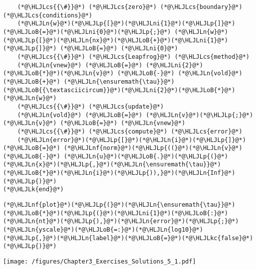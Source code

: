 \documentclass[12pt,a4paper]{article}
\newcommand{\HLJLk}[1]{\textcolor[RGB]{148,91,176}{\textbf{#1}}}
\newcommand{\HLJLkc}[1]{\textcolor[RGB]{59,151,46}{\textit{#1}}}
\newcommand{\HLJLn}[1]{#1}
\newcommand{\HLJLnf}[1]{\textcolor[RGB]{66,102,213}{#1}}
\newcommand{\HLJLni}[1]{\textcolor[RGB]{59,151,46}{#1}}
\newcommand{\HLJLoB}[1]{\textcolor[RGB]{102,102,102}{\textbf{#1}}}
\newcommand{\HLJLp}[1]{#1}
\newcommand{\HLJLcs}[1]{\textcolor[RGB]{153,153,119}{\textit{#1}}}
\begin{document}
\begin{lstlisting}
    (*@\HLJLcs{{\#}}@*) (*@\HLJLcs{zero}@*) (*@\HLJLcs{boundary}@*) (*@\HLJLcs{conditions}@*)
    (*@\HLJLn{w}@*)(*@\HLJLp{[}@*)(*@\HLJLni{1}@*)(*@\HLJLp{]}@*)(*@\HLJLoB{=}@*)(*@\HLJLni{0}@*)(*@\HLJLp{;}@*) (*@\HLJLn{w}@*)(*@\HLJLp{[}@*)(*@\HLJLn{nx}@*)(*@\HLJLoB{+}@*)(*@\HLJLni{1}@*)(*@\HLJLp{]}@*) (*@\HLJLoB{=}@*) (*@\HLJLni{0}@*)
    (*@\HLJLcs{{\#}}@*) (*@\HLJLcs{Leapfrog}@*) (*@\HLJLcs{method}@*)
    (*@\HLJLn{vnew}@*) (*@\HLJLoB{=}@*) (*@\HLJLni{2}@*)(*@\HLJLoB{*}@*)(*@\HLJLn{v}@*) (*@\HLJLoB{-}@*) (*@\HLJLn{vold}@*) (*@\HLJLoB{+}@*) (*@\HLJLn{\ensuremath{\tau}}@*)(*@\HLJLoB{{\textasciicircum}}@*)(*@\HLJLni{2}@*)(*@\HLJLoB{*}@*)(*@\HLJLn{w}@*) 
    (*@\HLJLcs{{\#}}@*) (*@\HLJLcs{update}@*)
    (*@\HLJLn{vold}@*) (*@\HLJLoB{=}@*) (*@\HLJLn{v}@*)(*@\HLJLp{;}@*) (*@\HLJLn{v}@*) (*@\HLJLoB{=}@*) (*@\HLJLn{vnew}@*)
    (*@\HLJLcs{{\#}}@*) (*@\HLJLcs{compute}@*) (*@\HLJLcs{error}@*)
    (*@\HLJLn{error}@*)(*@\HLJLp{[}@*)(*@\HLJLn{i}@*)(*@\HLJLp{]}@*) (*@\HLJLoB{=}@*) (*@\HLJLnf{norm}@*)(*@\HLJLp{((}@*)(*@\HLJLn{v}@*) (*@\HLJLoB{-}@*) (*@\HLJLn{u}@*)(*@\HLJLoB{.}@*)(*@\HLJLp{(}@*)(*@\HLJLn{x}@*)(*@\HLJLp{,}@*)(*@\HLJLn{\ensuremath{\tau}}@*)(*@\HLJLoB{*}@*)(*@\HLJLn{i}@*)(*@\HLJLp{)),}@*)(*@\HLJLn{Inf}@*)(*@\HLJLp{)}@*)
(*@\HLJLk{end}@*)
\end{lstlisting}


\begin{lstlisting}
(*@\HLJLnf{plot}@*)(*@\HLJLp{(}@*)(*@\HLJLn{\ensuremath{\tau}}@*)(*@\HLJLoB{*}@*)(*@\HLJLp{(}@*)(*@\HLJLni{1}@*)(*@\HLJLoB{:}@*)(*@\HLJLn{nt}@*)(*@\HLJLp{),}@*)(*@\HLJLn{error}@*)(*@\HLJLp{;}@*)(*@\HLJLn{yscale}@*)(*@\HLJLoB{=:}@*)(*@\HLJLn{log10}@*)(*@\HLJLp{,}@*)(*@\HLJLn{label}@*)(*@\HLJLoB{=}@*)(*@\HLJLkc{false}@*)(*@\HLJLp{)}@*)
\end{lstlisting}

\texttt{[image: /figures/Chapter3\_Exercises\_Solutions\_5\_1.pdf]}
\end{document}
